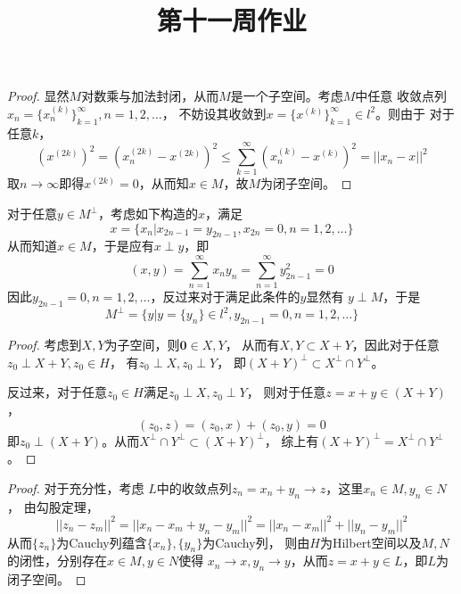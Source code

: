 \documentclass[cn]{homework}
\title{第十一周作业}
\begin{document}
    \maketitle

    \problem
    \begin{proof}
        显然$M$对数乘与加法封闭，从而$M$是一个子空间。考虑$M$中任意
        收敛点列$x_n=\{x_n^{(k)}\}_{k=1}^\infty,n=1,2,\ldots$，
        不妨设其收敛到$x=\{x^{(k)}\}_{k=1}^\infty\in l^2$。则由于
        对于任意$k$，
        \[\left(x^{(2k)}\right)^2=\left(x_n^{(2k)}-x^{(2k)}\right)^2
        \leq\sum_{k=1}^\infty \left(x_n^{(k)}-x^{(k)}\right)^2
        =||x_n-x||^2\]
        取$n\to\infty$即得$x^{(2k)}=0$，从而知$x\in M$，故$M$为闭子空间。
    \end{proof}

    对于任意$y\in M^\perp$，考虑如下构造的$x$，满足
    \[x=\{x_n|x_{2n-1}=y_{2n-1},x_{2n}=0,n=1,2,\ldots\}\]
    从而知道$x\in M$，于是应有$x\perp y$，即
    \[(x,y)=\sum_{n=1}^\infty x_ny_n=\sum_{n=1}^\infty y_{2n-1}^2=0\]
    因此$y_{2n-1}=0,n=1,2,\ldots$，反过来对于满足此条件的$y$显然有
    $y\perp M$，于是
    \[M^\perp=\{y|y=\{y_n\}\in l^2,y_{2n-1}=0,n=1,2,\ldots\}\]

    \problem
    \begin{proof}
        考虑到$X,Y$为子空间，则$\boldsymbol 0\in X,Y$，
        从而有$X,Y\subset X+Y$，因此对于任意$z_0\perp X+Y,z_0\in H$，
        有$z_0\perp X,z_0\perp Y$，
        即$(X+Y)^\perp\subset X^\perp\cap Y^\perp$。

        反过来，对于任意$z_0\in H$满足$z_0\perp X,z_0\perp Y$，
        则对于任意$z=x+y\in (X+Y)$，
        \[(z_0,z)=(z_0,x)+(z_0,y)=0\]
        即$z_0\perp (X+Y)$。从而$X^\perp\cap Y^\perp\subset (X+Y)^\perp$，
        综上有$(X+Y)^\perp=X^\perp\cap Y^\perp$。
    \end{proof}

    \problem
    \begin{proof}
        对于充分性，考虑
        $L$中的收敛点列$z_n=x_n+y_n\to z$，这里$x_n\in M,y_n\in N$，
        由勾股定理，
        \[||z_n-z_m||^2=||x_n-x_m+y_n-y_m||^2=||x_n-x_m||^2+||y_n-y_m||^2\]
        从而$\{z_n\}$为Cauchy列蕴含$\{x_n\},\{y_n\}$为Cauchy列，
        则由$H$为Hilbert空间以及$M,N$的闭性，分别存在$x\in M,y\in N$使得
        $x_n\to x,y_n\to y$，从而$z=x+y\in L$，即$L$为闭子空间。

        
    \end{proof}
\end{document}
